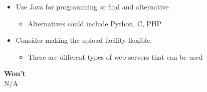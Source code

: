 \begin{itemize}
    \item Use Java for programming or find and alternative 
    \begin{itemize}
        \item Alternatives could include Python, C, PHP 
    \end{itemize}
    \item Consider making the upload facility flexible.
    \begin{itemize}
        \item There are different types of web-servers that can be used
    \end{itemize}
\end{itemize}
\textbf{Won't}\\
N/A